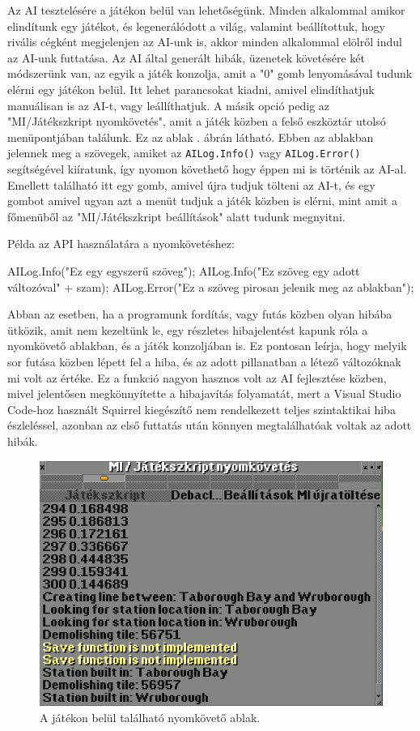 Az AI tesztelésére a játékon belül van lehetőségünk. Minden alkalommal amikor elindítunk egy játékot, és legenerálódott a világ, valamint beállítottuk, hogy rivális cégként megjelenjen az AI-unk is, akkor minden alkalommal elölről indul az AI-unk futtatása. Az AI által generált hibák, üzenetek követésére két módszerünk van, az egyik a játék konzolja, amit a "0" gomb lenyomásával tudunk elérni egy játékon belül. Itt lehet parancsokat kiadni, amivel elindíthatjuk manuálisan is az AI-t, vagy leállíthatjuk. A másik opció pedig az "MI/Játékszkript nyomkövetés", amit a játék közben a felső eszköztár utolsó menüpontjában találunk. Ez az ablak . ábrán látható. Ebben az ablakban jelennek meg a szövegek, amiket az \texttt{AILog.Info()} vagy \texttt{AILog.Error()} segítségével kiíratunk, így nyomon követhető hogy éppen mi is történik az AI-al. Emellett található itt egy gomb, amivel újra tudjuk tölteni az AI-t, és egy gombot amivel ugyan azt a menüt tudjuk a játék közben is elérni, mint amit a főmenüből az "MI/Játékszkript beállítások" alatt tudunk megnyitni.

Példa az API használatára a nyomkövetéshez:
\begin{cpp}
AILog.Info("Ez egy egyszerű szöveg");
AILog.Info("Ez szöveg egy adott változóval" + szam);
AILog.Error("Ez a szöveg pirosan jelenik meg az ablakban");
\end{cpp}

Abban az esetben, ha a programunk fordítás, vagy futás közben olyan hibába ütközik, amit nem kezeltünk le, egy részletes hibajelentést kapunk róla a nyomkövető ablakban, és a játék konzoljában is. Ez pontosan leírja, hogy melyik sor futása közben lépett fel a hiba, és az adott pillanatban a létező változóknak mi volt az értéke. Ez a funkció nagyon hasznos volt az AI fejlesztése közben, mivel jelentősen megkönnyítette a hibajavítás folyamatát, mert a Visual Studio Code-hoz használt Squirrel kiegészítő nem rendelkezett teljes szintaktikai hiba észleléssel, azonban az első futtatás után könnyen megtalálhatóak voltak az adott hibák.

\begin{figure}
	\centering
	\includegraphics[width=\textwidth]{images/console.png}
	\caption{A játékon belül található nyomkövető ablak.}
	\label{fig:console}
\end{figure}

